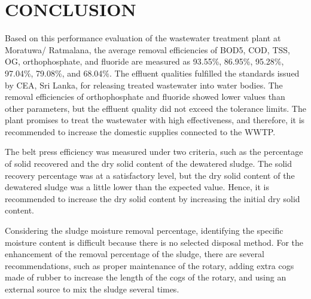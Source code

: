 \newpage
\section{CONCLUSION}


Based on this performance evaluation of the wastewater treatment plant at Moratuwa/ Ratmalana, the average removal efficiencies of \ac{BOD5}, \ac{COD}, \ac{TSS}, \ac{OG}, orthophosphate, and fluoride are measured as 93.55\%, 86.95\%, 95.28\%, 97.04\%, 79.08\%, and 68.04\%. The effluent qualities fulfilled the standards issued by \ac{CEA}, Sri Lanka, for releasing treated wastewater into water bodies. The removal efficiencies of orthophosphate and fluoride showed lower values than other parameters, but the effluent quality did not exceed the tolerance limits. The plant promises to treat the wastewater with high effectiveness, and therefore, it is recommended to increase the domestic supplies connected to the \ac{WWTP}.

The belt press efficiency was measured under two criteria, such as the percentage of solid recovered and the dry solid content of the dewatered sludge. The solid recovery percentage was at a satisfactory level, but the dry solid content of the dewatered sludge was a little lower than the expected value. Hence, it is recommended to increase the dry solid content by increasing the initial dry solid content. 

Considering the sludge moisture removal percentage, identifying the specific moisture content is difficult because there is no selected disposal method. For the enhancement of the removal percentage of the sludge, there are several recommendations, such as proper maintenance of the rotary, adding extra cogs made of rubber to increase the length of the cogs of the rotary, and using an external source to mix the sludge several times.